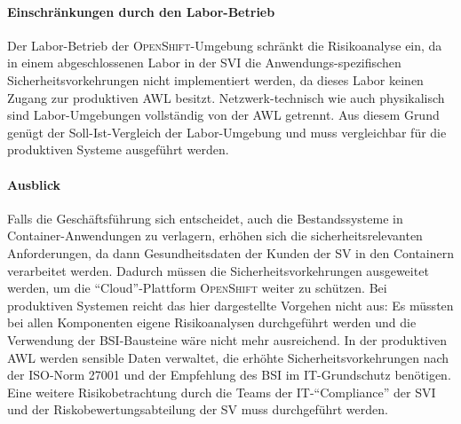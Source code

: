 \paragraph{Einschränkungen durch den Labor-Betrieb} Der Labor-Betrieb der \textsc{OpenShift}-Umgebung schränkt die Risikoanalyse ein, da in einem abgeschlossenen Labor in der \ac{SVI} die Anwendungs-spezifischen Sicherheitsvorkehrungen nicht implementiert werden, da dieses Labor keinen Zugang zur produktiven \ac{AWL} besitzt. Netzwerk-technisch wie auch physikalisch sind Labor-Umgebungen vollständig von der \ac{AWL} getrennt. Aus diesem Grund genügt der Soll-Ist-Vergleich der Labor-Umgebung und muss vergleichbar für die produktiven Systeme ausgeführt werden.

\paragraph{Ausblick} Falls die Geschäftsführung sich entscheidet, auch die Bestandssysteme in Container-Anwendungen zu verlagern, erhöhen sich die sicherheitsrelevanten Anforderungen, da dann Gesundheitsdaten der Kunden der \ac{SV} in den Containern verarbeitet werden. Dadurch müssen die Sicherheitsvorkehrungen ausgeweitet werden, um die \enquote{Cloud}-Plattform \textsc{OpenShift} weiter zu schützen. Bei produktiven Systemen reicht das hier dargestellte Vorgehen nicht aus: Es müssten bei allen Komponenten eigene Risikoanalysen durchgeführt werden und die Verwendung der \ac{BSI}-Bausteine wäre nicht mehr ausreichend. In der produktiven \ac{AWL} werden sensible Daten verwaltet, die erhöhte Sicherheitsvorkehrungen nach der ISO-Norm 27001\autocite[vgl.][]{dindeutsches_institut_fur_normung_informationstechnik_2020} und der Empfehlung des \ac{BSI} im IT-Grundschutz\autocite[vgl.][]{bundesamt_fur_sicherheit_in_der_informationstechnik_bsi_it-grundschutz-kompendium_2020} benötigen. Eine weitere Risikobetrachtung durch die Teams der IT-\enquote{Compliance} der \ac{SVI} und der Riskobewertungsabteilung der \ac{SV} muss durchgeführt werden. 
